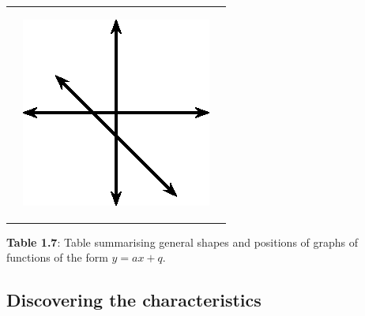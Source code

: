 \begin{table}[H]
\begin{center}
\begin{xtabular*}{\mytablewidth}[t]{|p{10\mystarwidth}|p{10\mystarwidth}|p{10\mystarwidth}|}
\begin{center}
    \vspace{.1in}
    \end{center}    
                 &
    \setcounter{subfigure}{0}
\label{m39338*id238365}
    \begin{center}
    \label{m39338*id238365!!!underscore!!!media}\label{m39338*id238365!!!underscore!!!printimage}\includegraphics[width=.3\columnwidth]{col11306.imgs/m39338_MG10C11_009.png} %
      \vspace{2pt}
    \vspace{.1in}
    \end{center}    
     \tabularnewline{}
    \end{xtabular*}
      \end{center}
    \begin{center}{\small\bfseries Table 1.7}: Table summarising general shapes and positions of graphs of functions of the form $y=ax+q$.\end{center}
    \end{table}   %
    \par
 \subsection{Discovering the characteristics} 
        \label{m39338*uid83}
